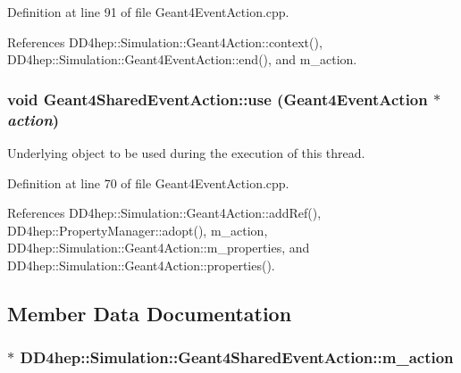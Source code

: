 Definition at line 91 of file Geant4EventAction.cpp.

References DD4hep::Simulation::Geant4Action::context(), DD4hep::Simulation::Geant4EventAction::end(), and m\_\-action.\hypertarget{class_d_d4hep_1_1_simulation_1_1_geant4_shared_event_action_a1b553e6983d3ce8bb3a84f660216175b}{
\subsubsection[{use}]{\setlength{\rightskip}{0pt plus 5cm}void Geant4SharedEventAction::use ({\bf Geant4EventAction} $\ast$ {\em action})}}
\label{class_d_d4hep_1_1_simulation_1_1_geant4_shared_event_action_a1b553e6983d3ce8bb3a84f660216175b}


Underlying object to be used during the execution of this thread. 

Definition at line 70 of file Geant4EventAction.cpp.

References DD4hep::Simulation::Geant4Action::addRef(), DD4hep::PropertyManager::adopt(), m\_\-action, DD4hep::Simulation::Geant4Action::m\_\-properties, and DD4hep::Simulation::Geant4Action::properties().

\subsection{Member Data Documentation}
\hypertarget{class_d_d4hep_1_1_simulation_1_1_geant4_shared_event_action_aa79a57a0581a48e4f211acec481ada26}{
\subsubsection[{m\_\-action}]{$\ast$ {\bf DD4hep::Simulation::Geant4SharedEventAction::m\_\-action}}}
\label{class_d_d4hep_1_1_simulation_1_1_geant4_shared_event_action_aa79a57a0581a48e4f211acec481ada26}


